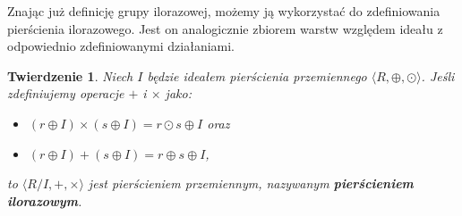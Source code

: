\documentclass[polish,declaration,shortabstract]{iithesis}
\theoremstyle{definition}
\theoremstyle{remark} \newtheorem{observation}{Obserwacja}
\theoremstyle{plain} \newtheorem{theorem}{Twierdzenie}
\theoremstyle{plain} \newtheorem{lemma}{Lemat}
\theoremstyle{remark} \newtheorem*{remark*}{Uwaga}
\theoremstyle{reminder} \newtheorem*{reminder*}{Przypomnienie}
\begin{document}
Znając już definicję grupy ilorazowej, możemy ją wykorzystać do zdefiniowania pierścienia ilorazowego. Jest on analogicznie zbiorem warstw względem ideału z odpowiednio zdefiniowanymi działaniami.

\begin{theorem}
	Niech $I$ będzie ideałem pierścienia przemiennego $\langle R, \oplus, \odot \rangle$. Jeśli zdefiniujemy operacje $+$ i $\times$ jako: 
	\begin{itemize}[leftmargin=.4in]
		\item $(r \oplus I) \times (s \oplus I) = r \odot s \oplus I$ oraz
		\item $(r \oplus I) + (s \oplus I) = r \oplus s \oplus I$,
	\end{itemize}
	to $\langle R/I, +, \times \rangle$ jest pierścieniem przemiennym, nazywanym \textbf{\textit{pierścieniem ilorazowym}}.
\end{theorem}

\end{document}
